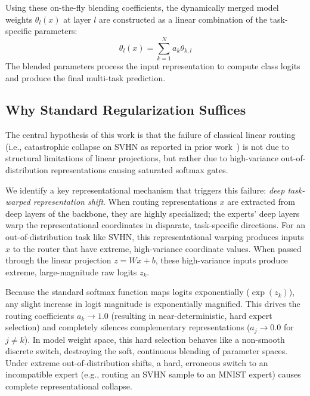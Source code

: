 Using these on-the-fly blending coefficients, the dynamically merged model weights $\theta_l(x)$ at layer $l$ are constructed as a linear combination of the task-specific parameters:
\begin{equation}
\theta_l(x) = \sum_{k=1}^N a_k \theta_{k, l}
\end{equation}
The blended parameters process the input representation to compute class logits and produce the final multi-task prediction.

\subsection{Why Standard Regularization Suffices}

The central hypothesis of this work is that the failure of classical linear routing (i.e., catastrophic collapse on SVHN as reported in prior work~\cite{vance2025quantum}) is not due to structural limitations of linear projections, but rather due to high-variance out-of-distribution representations causing saturated softmax gates. 

We identify a key representational mechanism that triggers this failure: \emph{deep task-warped representation shift}. When routing representations $x$ are extracted from deep layers of the backbone, they are highly specialized; the experts' deep layers warp the representational coordinates in disparate, task-specific directions. For an out-of-distribution task like SVHN, this representational warping produces inputs $x$ to the router that have extreme, high-variance coordinate values. When passed through the linear projection $z = W x + b$, these high-variance inputs produce extreme, large-magnitude raw logits $z_k$. 

Because the standard softmax function maps logits exponentially ($\exp(z_k)$), any slight increase in logit magnitude is exponentially magnified. This drives the routing coefficients $a_k \to 1.0$ (resulting in near-deterministic, hard expert selection) and completely silences complementary representations ($a_j \to 0.0$ for $j \neq k$). In model weight space, this hard selection behaves like a non-smooth discrete switch, destroying the soft, continuous blending of parameter spaces. Under extreme out-of-distribution shifts, a hard, erroneous switch to an incompatible expert (e.g., routing an SVHN sample to an MNIST expert) causes complete representational collapse.

